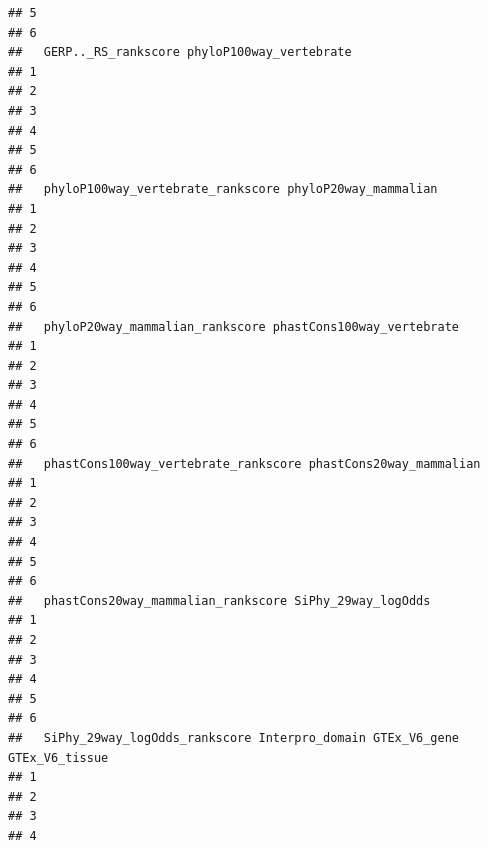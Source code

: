 \documentclass[
]{article}
\begin{document}
\begin{verbatim}
## 5                                                                         
## 6                                                                         
##   GERP.._RS_rankscore phyloP100way_vertebrate
## 1                                            
## 2                                            
## 3                                            
## 4                                            
## 5                                            
## 6                                            
##   phyloP100way_vertebrate_rankscore phyloP20way_mammalian
## 1                                                        
## 2                                                        
## 3                                                        
## 4                                                        
## 5                                                        
## 6                                                        
##   phyloP20way_mammalian_rankscore phastCons100way_vertebrate
## 1                                                           
## 2                                                           
## 3                                                           
## 4                                                           
## 5                                                           
## 6                                                           
##   phastCons100way_vertebrate_rankscore phastCons20way_mammalian
## 1                                                              
## 2                                                              
## 3                                                              
## 4                                                              
## 5                                                              
## 6                                                              
##   phastCons20way_mammalian_rankscore SiPhy_29way_logOdds
## 1                                                       
## 2                                                       
## 3                                                       
## 4                                                       
## 5                                                       
## 6                                                       
##   SiPhy_29way_logOdds_rankscore Interpro_domain GTEx_V6_gene GTEx_V6_tissue
## 1                                                                          
## 2                                                                          
## 3                                                                          
## 4                                                                          

\end{verbatim}
\end{document}

